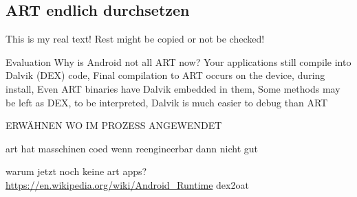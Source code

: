 \subsection{ART endlich durchsetzen} \label{subsection:external-art}
This is my real text! Rest might be copied or not be checked!


%
Evaluation
Why is Android not all ART now? Your applications still compile into Dalvik (DEX) code, Final compilation to ART occurs on the device, during install, Even ART binaries have Dalvik embedded in them, Some methods may be left as DEX, to be interpreted, Dalvik is much easier to debug than ART\newline
\cite{andevconDalvikART}
%

ERWÄHNEN WO IM PROZESS ANGEWENDET\newline

art hat masschinen coed\newline
wenn reengineerbar dann nicht gut

warum jetzt noch keine art apps?
\url{https://en.wikipedia.org/wiki/Android_Runtime}\newline
dex2oat\newline
